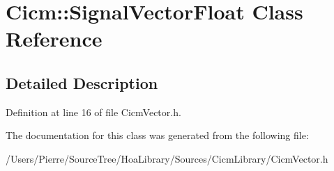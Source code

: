 \hypertarget{class_cicm_1_1_signal_vector_float}{\section{Cicm\-:\-:Signal\-Vector\-Float Class Reference}
\label{class_cicm_1_1_signal_vector_float}
}


\subsection{Detailed Description}


Definition at line 16 of file Cicm\-Vector.\-h.



The documentation for this class was generated from the following file\-:\begin{DoxyCompactItemize}
\item 
/\-Users/\-Pierre/\-Source\-Tree/\-Hoa\-Library/\-Sources/\-Cicm\-Library/Cicm\-Vector.\-h\end{DoxyCompactItemize}
